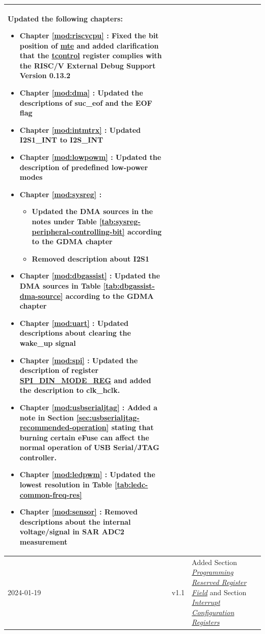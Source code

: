 \begin{longtable}[l]{ | m{2cm} | m{1.5cm} | m{12cm} | }
    Updated the following chapters:
        \begin{itemize}
            \item Chapter \ref{mod:riscvcpu} \textit{\nameref{mod:riscvcpu}}: Fixed the bit position of \hyperref[fielddesc:TCONTROLMTE]{mte} and added clarification that the \hyperref[regdesc:TCONTROL]{tcontrol} register complies with the RISC\-/V External Debug Support Version 0.13.2
            \item Chapter \ref{mod:dma} \textit{\nameref{mod:dma}}: Updated the descriptions of suc\_eof and the EOF flag %
            \item Chapter \ref{mod:intmtrx} \textit{\nameref{mod:intmtrx}}: Updated I2S1\_INT to I2S\_INT %
            \item Chapter \ref{mod:lowpowm} \textit{\nameref{mod:lowpowm}}: Updated the description of predefined low-power modes %
            \item Chapter \ref{mod:sysreg} \textit{\nameref{mod:sysreg}}:
            \begin{itemize}
                \item Updated the DMA sources in the notes under Table \ref{tab:sysreg-peripheral-controlling-bit} according to the GDMA chapter %
                \item Removed description about I2S1 %
            \end{itemize}
            \item Chapter \ref{mod:dbgassist} \textit{\nameref{mod:dbgassist}}: Updated the DMA sources in Table \ref{tab:dbgassist-dma-source} according to the GDMA chapter %
            \item Chapter \ref{mod:uart} \textit{\nameref{mod:uart}}: Updated descriptions about clearing the wake\_up signal %
            \item Chapter \ref{mod:spi} \textit{\nameref{mod:spi}}: Updated the description of register \hyperref[regdesc:SPIDINMODEREG]{SPI\_DIN\_MODE\_REG} and added the description to clk\_hclk. %
            \item Chapter \ref{mod:usbserialjtag} \textit{\nameref{mod:usbserialjtag}}: Added a note in Section \ref{sec:usbserialjtag-recommended-operation} stating that burning certain eFuse can affect the normal operation of USB Serial/JTAG controller. %
            \item Chapter \ref{mod:ledpwm} \textit{\nameref{mod:ledpwm}}: Updated the lowest resolution in Table \ref{tab:ledc-common-freq-res}  %
            \item Chapter \ref{mod:sensor} \textit{\nameref{mod:sensor}}: Removed descriptions about the internal voltage/signal in SAR ADC2 measurement %
        \end{itemize}
    \\\hline
    2024-01-19 & v1.1 &
    Added Section \hyperref[programming-reserved-field]{\textit{Programming Reserved Register Field}} and Section \hyperref[interrupt-config-registers]{\textit{Interrupt Configuration Registers}}


\end{longtable}
